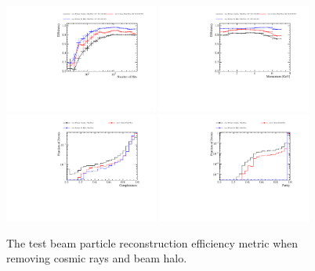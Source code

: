 \begin{figure}
\centering
\includegraphics[width=0.45\textwidth]{Figures/Metrics/MC/Beam/Breakdown/BeamParticleEfficiencyBreakdownVsNHits.pdf}
\includegraphics[width=0.45\textwidth]{Figures/Metrics/MC/Beam/Breakdown/BeamParticleEfficiencyBreakdownVsMomentum.pdf} \\
\includegraphics[width=0.45\textwidth]{Figures/Metrics/MC/Beam/Breakdown/BeamParticleCompleteness.pdf}
\includegraphics[width=0.45\textwidth]{Figures/Metrics/MC/Beam/Breakdown/BeamParticlePurity.pdf}
\caption{The test beam particle reconstruction efficiency metric when removing cosmic rays and beam halo.}
\label{fig:tbrecoeffbrkdwn}
\end{figure}

